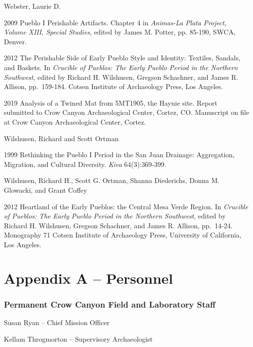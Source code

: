\documentclass[
  12pt,
]{krantz}
\begin{document}
Webster, Laurie D.

2009 Pueblo I Perishable Artifacts. Chapter 4 in \emph{Animas-La Plata
Project, Volume XIII, Special Studies}, edited by James M. Potter, pp.
85-190, SWCA, Denver.

2012 The Perishable Side of Early Pueblo Style and Identity: Textiles,
Sandals, and Baskets. In \emph{Crucible of Pueblos: The Early Pueblo Period
in the Northern Southwest}, edited by Richard H. Wilshusen, Gregson
Schachner, and James R. Allison, pp.~159-184. Cotsen Institute of
Archaeology Press, Los Angeles.

2019 Analysis of a Twined Mat from 5MT1905, the Haynie site. Report
submitted to Crow Canyon Archaeological Center, Cortez, CO. Manuscript
on file at Crow Canyon Archaeological Center, Cortez.

Wilshusen, Richard and Scott Ortman

1999 Rethinking the Pueblo I Period in the San Juan Drainage:
Aggregation, Migration, and Cultural Diversity. \emph{Kiva} 64(3):369-399.

Wilshusen, Richard H., Scott G. Ortman, Shanna Diederichs, Donna M.
Glowacki, and Grant Coffey

2012 Heartland of the Early Pueblos: the Central Mesa Verde Region. In
\emph{Crucible of Pueblos: The Early Pueblo Period in the Northern
Southwest}, edited by Richard H. Wilshusen, Gregson Schachner, and James
R. Allison, pp.~14-24. Monography 71 Cotsen Institute of Archaeology
Press, University of California, Los Angeles.

\backmatter

\hypertarget{appendix-a-personnel}{%
\chapter{Appendix A -- Personnel}\label{appendix-a-personnel}}

\hypertarget{permanent-crow-canyon-field-and-laboratory-staff}{%
\subsection*{Permanent Crow Canyon Field and Laboratory Staff}\label{permanent-crow-canyon-field-and-laboratory-staff}}

Susan Ryan -- Chief Mission Officer

Kellam Throgmorton -- Supervisory Archaeologist
\end{document}
